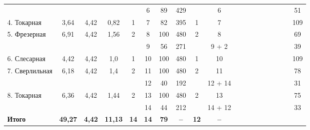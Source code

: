\begin{landscape}
\begin{table} [h!]
{\begin{tabular}{
      | p{2.2cm} | c | c | c | c | c | c | c | c | c 
      | m{1cm} m{1cm} m{1cm} m{1cm} m{1cm} m{1cm} m{1cm} m{1cm} 
      | c |
      }
   & & & 
   & 
   & 6 
   & 89 & 429
   & 
   & 6
   & & & & & & & &
   & 51 \\ \cline{1-10}\cline{19-19}

   4. Токарная
   & 3{,}64 & 4{,}42
   & 0{,}82 & 1
   & 7 
   & 82 & 395
   & 1
   & 7
   & & & & & & & &
   & 109 \\ \cline{1-10}\cline{19-19}

   \multirow{2}{*}{5. Фрезерная} 
   & \multirow{2}{*}{6{,}91} & \multirow{2}{*}{4{,}42}
   & \multirow{2}{*}{1{,}56} & \multirow{2}{*}{2}
   & 8 
   & 100 & 480
   & \multirow{2}{*}{2}
   & 8
   & & & & & & & &
   & 69 \\

   & & & 
   & 
   & 9 
   & 56 & 271
   & 
   & 9 + 2
   & & & & & & & &
   & 39 \\ \cline{1-10}\cline{19-19}

   6. Слесарная
   & 4{,}42 & 4{,}42
   & 1{,}0 & 1
   & 10 
   & 100 & 480
   & 1
   & 10
   & & & & & & & &
   & 109 \\ \cline{1-10}\cline{19-19}

   \multirow{2}{*}{7. Сверлильная} 
   & \multirow{2}{*}{6{,}18} & \multirow{2}{*}{4{,}42}
   & \multirow{2}{*}{1{,}4} & \multirow{2}{*}{2}
   & 11 
   & 100 & 480
   & \multirow{2}{*}{2}
   & 11
   & & & & & & & &
   & 78 \\

   & & & 
   & 
   & 12 
   & 40 & 192
   & 
   & 12 + 14
   & & & & & & & &
   & 31 \\ \cline{1-10}\cline{19-19}

   \multirow{2}{*}{8. Токарная} 
   & \multirow{2}{*}{6{,}36} & \multirow{2}{*}{4{,}42}
   & \multirow{2}{*}{1{,}44} & \multirow{2}{*}{2}
   & 13 
   & 100 & 480
   & \multirow{2}{*}{2}
   & 13
   & & & & & & & &
   & 75 \\

   & & & 
   & 
   & 14
   & 44 & 212
   & 
   & 14 + 12
   & & & & & & & &
   & 33 \\ \cline{1-10}\cline{19-19}

   \raggedleft \textbf{Итого}
   & \textbf{49{,}27} & \textbf{4{,}42}
   & \textbf{11{,}13} & \textbf{14}
   & \textbf{14} 
   & \textbf{79} & \textbf{--}
   & \textbf{12}
   & \textbf{--}
   & & & & & & & &
   & \\ \hline

    \end{tabular}
  }
\end{table}


\end{landscape}
